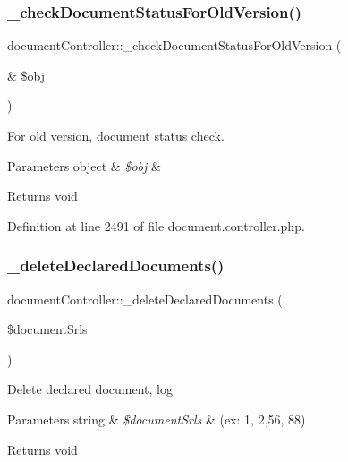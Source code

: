 \mbox{\label{classdocumentController_ad0d7bdcafe22b9f7ee8f5ae072f3f146}} 
\subsubsection{\texorpdfstring{\+\_\+check\+Document\+Status\+For\+Old\+Version()}{\_checkDocumentStatusForOldVersion()}}
{\footnotesize\ttfamily document\+Controller\+::\+\_\+check\+Document\+Status\+For\+Old\+Version (\begin{DoxyParamCaption}\item[{\&}]{\$obj }\end{DoxyParamCaption})}

For old version, document status check. 
\begin{DoxyParams}[1]{Parameters}
object & {\em \$obj} & \\
\hline
\end{DoxyParams}
\begin{DoxyReturn}{Returns}
void 
\end{DoxyReturn}


Definition at line 2491 of file document.\+controller.\+php.

\mbox{\label{classdocumentController_a2514acfe313b7ddd5daccb50557d38b5}} 
\subsubsection{\texorpdfstring{\+\_\+delete\+Declared\+Documents()}{\_deleteDeclaredDocuments()}}
{\footnotesize\ttfamily document\+Controller\+::\+\_\+delete\+Declared\+Documents (\begin{DoxyParamCaption}\item[{}]{\$document\+Srls }\end{DoxyParamCaption})}

Delete declared document, log 
\begin{DoxyParams}[1]{Parameters}
string & {\em \$document\+Srls} & (ex\+: 1, 2,56, 88) \\
\hline
\end{DoxyParams}
\begin{DoxyReturn}{Returns}
void 
\end{DoxyReturn}


